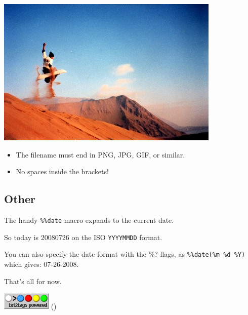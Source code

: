 \documentclass{article}
\begin{document}
                      \includegraphics{img/photo.jpg}  

\begin{itemize}
\item The filename must end in PNG, JPG, GIF, or similar.
\item No spaces inside the brackets!
\end{itemize}

\subsection*{Other}
The handy \texttt{\%\%date} macro expands to the current date.

So today is 20080726 on the ISO \texttt{YYYYMMDD} format.

You can also specify the date format with the \%? flags,
as \texttt{\%\%date(\%m-\%d-\%Y)} which gives: 07-26-2008.

That's all for now.


\hrulefill{}

\includegraphics{img/t2tpowered.png} ()


\end{document}
